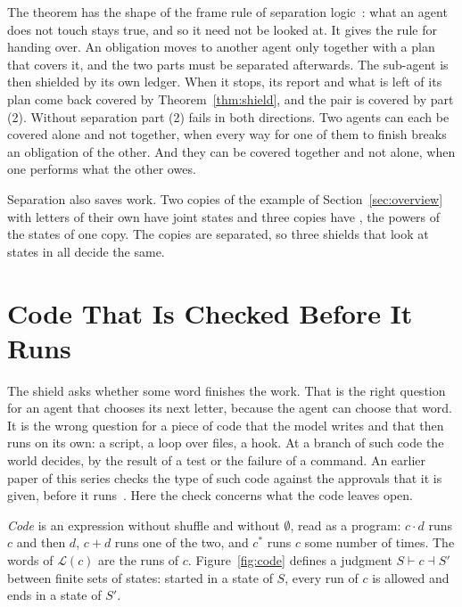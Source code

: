 \documentclass[acmsmall,nonacm,screen]{acmart}
\newcommand{\lang}[1]{\mathcal{L}(#1)}
\newcommand{\claim}[2]{#2}
\begin{document}
The theorem has the shape of the frame rule of separation logic~\cite{reynolds2002,
ohearn2007}: what an agent does not touch stays true, and so it need not be looked at. It
gives the rule for handing over. An obligation moves to another agent only together with a
plan that covers it, and the two parts must be separated afterwards. The sub-agent is then
shielded by its own ledger. When it stops, its report and what is left of its plan come back
covered by Theorem~\ref{thm:shield}, and the pair is covered by part (2).
\claim{not-separated-differ}{Without separation part (2) fails in both directions.} Two
agents can each be covered alone and not together, when every way for one of them to finish
breaks an obligation of the other. And they can be covered together and not alone, when one
performs what the other owes.

Separation also saves work. \claim{copies-multiply}{Two copies of the example of
Section~\ref{sec:overview} with letters of their own have \exCopiesTwo{} joint states and
three copies have \exCopiesThree{}}, the powers of the \exExampleStates{} states of one
copy. The copies are separated, so three shields that look at \exApartThree{} states in all
decide the same.

\section{Code That Is Checked Before It Runs}
\label{sec:code}

The shield asks whether some word finishes the work. That is the right question for an
agent that chooses its next letter, because the agent can choose that word. It is the wrong
question for a piece of code that the model writes and that then runs on its own: a script,
a loop over files, a hook. At a branch of such code the world decides, by the result of a
test or the failure of a command. An earlier paper of this series checks the type of such
code against the approvals that it is given, before it runs~\cite{tpp4}. Here the check
concerns what the code leaves open.

\emph{Code} is an expression without shuffle and without $\emptyset$, read as a program: $c \cdot d$ runs $c$ and
then $d$, $c + d$ runs one of the two, and $c^{*}$ runs $c$ some number of times. The words
of $\lang{c}$ are the runs of $c$. Figure~\ref{fig:code} defines a judgment
$S \vdash c \dashv S'$ between finite sets of states: started in a state of $S$, every run of
$c$ is allowed and ends in a state of $S'$.
\end{document}
